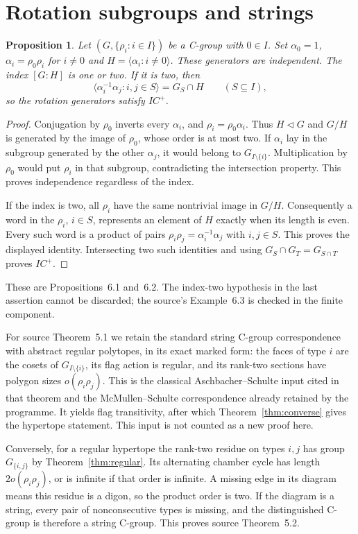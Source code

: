 \documentclass[11pt,a4paper]{article}
\newtheorem{proposition}[theorem]{Proposition}
\newcommand{\gen}[1]{\langle#1\rangle}
\begin{document}
\section{Rotation subgroups and strings}

\begin{proposition}\label{prop:rotation}
Let $(G,\{\rho_i:i\in I\})$ be a C-group with $0\in I$.
Set $\alpha_0=1$, $\alpha_i=\rho_0\rho_i$ for $i\ne0$ and
$H=\gen{\alpha_i:i\ne0}$.  These generators are independent.
The index $[G:H]$ is one or two.  If it is two, then
\[
 \gen{\alpha_i^{-1}\alpha_j:i,j\in S}=G_S\cap H
                         \qquad(S\subseteq I),
\]
so the rotation generators satisfy $IC^+$.
\end{proposition}
\begin{proof}
Conjugation by $\rho_0$ inverts every $\alpha_i$, and
$\rho_i=\rho_0\alpha_i$.  Thus $H\lhd G$ and $G/H$ is generated
by the image of $\rho_0$, whose order is at most two.
If $\alpha_i$ lay in the subgroup generated by the other $\alpha_j$,
it would belong to $G_{I\setminus\{i\}}$.  Multiplication by
$\rho_0$ would put $\rho_i$ in that subgroup, contradicting the
intersection property.  This proves independence regardless of the index.

If the index is two, all $\rho_i$ have the same nontrivial image in
$G/H$.  Consequently a word in the $\rho_i$, $i\in S$, represents
an element of $H$ exactly when its length is even.  Every such word is a
product of pairs $\rho_i\rho_j=\alpha_i^{-1}\alpha_j$ with
$i,j\in S$.  This proves the displayed identity.  Intersecting two
such identities and using $G_S\cap G_T=G_{S\cap T}$ proves $IC^+$.
\end{proof}
These are Propositions~6.1 and~6.2.  The index-two hypothesis in the last
assertion cannot be discarded; the source's Example~6.3 is checked in the
finite component.

For source Theorem~5.1 we retain the standard string C-group correspondence
with abstract regular polytopes, in its exact marked form: the faces of
type $i$ are the cosets of $G_{I\setminus\{i\}}$, its flag action is
regular, and its rank-two sections have polygon sizes
$o(\rho_i\rho_j)$.  This is the classical Aschbacher--Schulte input
cited in that theorem and the McMullen--Schulte correspondence already
retained by the programme.  It yields flag transitivity, after which
Theorem~\ref{thm:converse} gives the hypertope statement.  This input is
not counted as a new proof here.

Conversely, for a regular hypertope the rank-two residue on types $i,j$
has group $G_{\{i,j\}}$ by Theorem~\ref{thm:regular}.  Its alternating
chamber cycle has length $2o(\rho_i\rho_j)$, or is infinite if that
order is infinite.  A missing edge in its diagram means this residue is
a digon, so the product order is two.  If the diagram is a string, every
pair of nonconsecutive types is missing, and the distinguished C-group
is therefore a string C-group.  This proves source Theorem~5.2.
\end{document}
